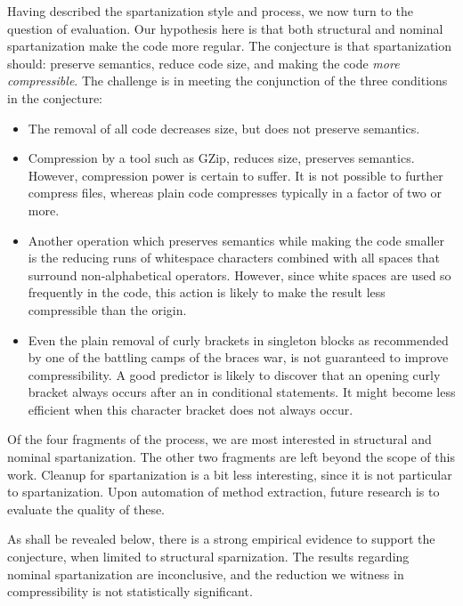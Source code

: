 Having described the spartanization style and process, we now turn to the
question of evaluation. Our hypothesis here is that both structural and
nominal spartanization make the code more regular. The conjecture is that
spartanization should: preserve semantics, reduce code size, and making the
code \emph{more compressible}. The challenge is in meeting the conjunction of
the three conditions in the conjecture:
\begin{itemize}
    \item The removal of all code decreases size, but does not preserve semantics.
    \item Compression by a tool such as GZip, reduces size, preserves
      semantics. However, compression power is certain to suffer. It is
      not possible to further compress  files, whereas plain code
      compresses typically in a factor of two or more.
    \item Another operation which preserves semantics while making
      the code smaller is the reducing runs of whitespace characters combined
      with all spaces that surround non-alphabetical operators.
      However, since white spaces are used so frequently in the code,
      this action is likely to make the result less compressible than the origin.
    \item Even the plain removal of curly brackets in singleton blocks as
      recommended by one of the battling camps of the braces war, is not guaranteed
      to improve compressibility. A good predictor is likely to discover that
      an opening curly bracket always occurs after an  in conditional statements.
      It might become less efficient when this character bracket does not always occur.
\end{itemize}

Of the four fragments of the process, we are most interested in structural and
nominal spartanization. The other two fragments are left beyond the scope of
this work. Cleanup for spartanization is a bit less interesting, since it is
not particular to spartanization. Upon automation of method extraction, future
research is to evaluate the quality of these.

As shall be revealed below, there is a strong empirical evidence to support
the conjecture, when limited to structural sparnization. The results regarding
nominal spartanization are inconclusive, and the reduction we witness in
compressibility is not statistically significant.

